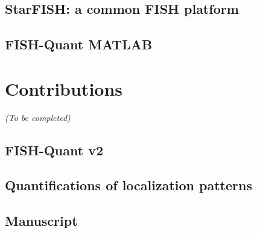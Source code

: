 


\subsection{StarFISH: a common \ac{FISH} platform}
\label{subsec:intro_starfish}

\subsection{FISH-Quant MATLAB}
\label{subsec:intro_fq1}


\section{Contributions}
\label{sec:contributions}

\begin{center}
	\textit{(To be completed)}
\end{center}

\subsection{FISH-Quant v2}
\label{subsec:intro_fq2}

\subsection{Quantifications of localization patterns}
\label{subsec:intro_applications}

\subsection{Manuscript}
\label{subsec:intro_manuscript}